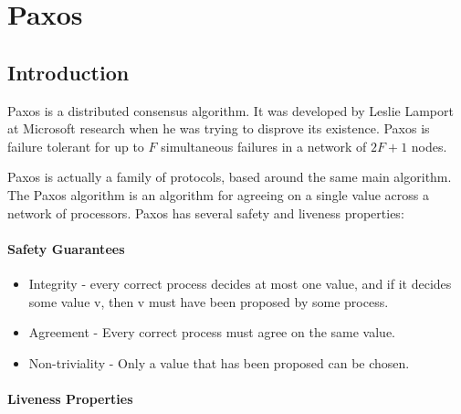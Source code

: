 \documentclass[12pt,twoside,notitlepage]{report}
\begin{document}

\section{Paxos}

\subsection{Introduction}

Paxos is a distributed consensus algorithm. It was developed by Leslie Lamport at Microsoft
research when he was trying to disprove its existence. Paxos is failure tolerant for up to $F$
simultaneous failures in a network of $2F + 1$ nodes.

Paxos is actually a family of protocols, based around the same main algorithm. The Paxos algorithm
is an algorithm for agreeing on a single value across a network of processors. Paxos has several
safety and liveness properties:

\paragraph{Safety Guarantees}

\begin{itemize}
\item Integrity - every correct process decides at most one value, and if it decides some value v,
	then v must have been proposed by some process.
\item Agreement - Every correct process must agree on the same value.
\item Non-triviality - Only a value that has been proposed can be chosen.
\end{itemize}

%
%
%

\paragraph{Liveness Properties}
\end{document}
